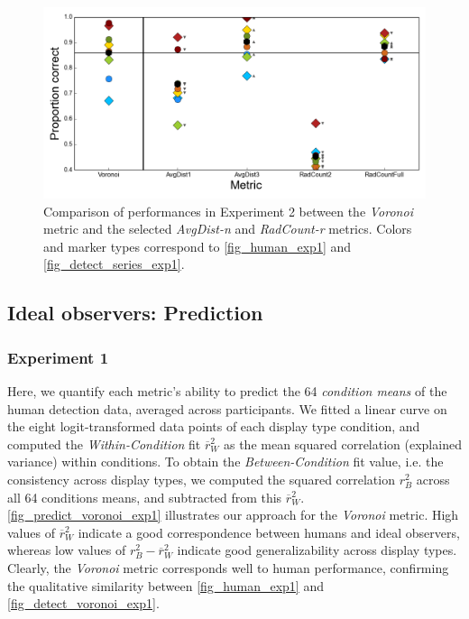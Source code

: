 \documentclass[12pt]{article}
\begin{document}
\begin{figure}[h!t]
\includegraphics{Figures/FIG_detect_series_exp2.png}
\caption{Comparison of performances in Experiment 2 between the \emph{Voronoi} metric and the selected \emph{AvgDist-n} and \emph{RadCount-r} metrics. Colors and marker types correspond to \autoref{fig_human_exp1} and \autoref{fig_detect_series_exp1}.}
\label{fig_detect_series_exp2}
\end{figure}


\subsection{Ideal observers: Prediction}\label{subsection_results_predict}

\subsubsection{Experiment 1}

Here, we quantify each metric's ability to predict the 64 \emph{condition means} of the human detection data, averaged across participants. We fitted a linear curve on the eight logit-transformed data points of each display type condition, and computed the \emph{Within-Condition} fit $\overline{r}^{2}_W$ as the mean squared correlation (explained variance) within conditions. To obtain the \emph{Between-Condition} fit value, i.e. the consistency across display types, we computed the squared correlation $r^{2}_B$ across all 64 conditions means, and subtracted from this $\overline{r}^{2}_W$. \autoref{fig_predict_voronoi_exp1} illustrates our approach for the \emph{Voronoi} metric. High values of $\overline{r}^{2}_W$ indicate a good correspondence between humans and ideal observers, whereas low values of $r^{2}_B -\overline{r}^{2}_W$ indicate good generalizability across display types. Clearly, the \emph{Voronoi} metric corresponds well to human performance, confirming the qualitative similarity between \autoref{fig_human_exp1} and \autoref{fig_detect_voronoi_exp1}.
\end{document}
